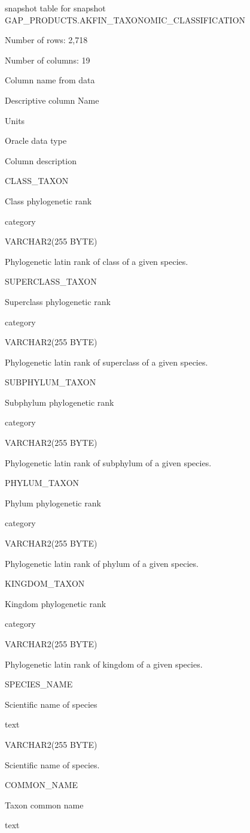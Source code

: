 \documentclass[
  letterpaper,
  oneside,
  open=any]{scrbook}
\begin{document}
snapshot table for snapshot
GAP\_PRODUCTS.AKFIN\_TAXONOMIC\_CLASSIFICATION

Number of rows: 2,718

Number of columns: 19

Column name from data

Descriptive column Name

Units

Oracle data type

Column description

CLASS\_TAXON

Class phylogenetic rank

category

VARCHAR2(255 BYTE)

Phylogenetic latin rank of class of a given species.

SUPERCLASS\_TAXON

Superclass phylogenetic rank

category

VARCHAR2(255 BYTE)

Phylogenetic latin rank of superclass of a given species.

SUBPHYLUM\_TAXON

Subphylum phylogenetic rank

category

VARCHAR2(255 BYTE)

Phylogenetic latin rank of subphylum of a given species.

PHYLUM\_TAXON

Phylum phylogenetic rank

category

VARCHAR2(255 BYTE)

Phylogenetic latin rank of phylum of a given species.

KINGDOM\_TAXON

Kingdom phylogenetic rank

category

VARCHAR2(255 BYTE)

Phylogenetic latin rank of kingdom of a given species.

SPECIES\_NAME

Scientific name of species

text

VARCHAR2(255 BYTE)

Scientific name of species.

COMMON\_NAME

Taxon common name

text
\end{document}
